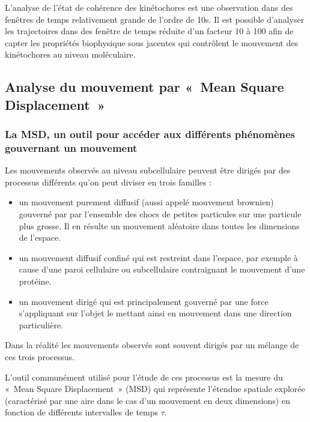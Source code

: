 \documentclass[12pt,a4paper,twoside,openright]{book}
\begin{document}
L'analyse de l'état de cohérence des kinétochores est une observation
dans des fenêtres de temps relativement grande de l'ordre de 10s. Il est
possible d'analyser les trajectoires dans des fenêtre de temps réduite
d'un facteur 10 à 100 afin de capter les propriétés biophysique sous
jacentes qui contrôlent le mouvement des kinétochores au niveau
moléculaire.

\subsection{Analyse du mouvement par «~Mean Square
Displacement~»}\label{analyse-du-mouvement-par-mean-square-displacement}

\subsubsection{La MSD, un outil pour accéder aux différents phénomènes
gouvernant un
mouvement}\label{la-msd-un-outil-pour-accuxe9der-aux-diffuxe9rents-phuxe9nomuxe8nes-gouvernant-un-mouvement}

Les mouvements observés au niveau subcellulaire peuvent être dirigés par
des processus différents qu'on peut diviser en trois familles :

\begin{itemize}
\item
  un mouvement purement diffusif (aussi appelé mouvement brownien)
  gouverné par par l'ensemble des chocs de petites particules sur une
  particule plus grosse. Il en résulte un mouvement aléatoire dans
  toutes les dimensions de l'espace.
\item
  un mouvement diffusif confiné qui est restreint dans l'espace, par
  exemple à cause d'une paroi cellulaire ou subcellulaire contraignant
  le mouvement d'une protéine.
\item
  un mouvement dirigé qui est principalement gouverné par une force
  s'appliquant sur l'objet le mettant ainsi en mouvement dans une
  direction particulière.
\end{itemize}

Dans la réalité les mouvements observés sont souvent dirigés par un
mélange de ces trois processus.

L'outil communément utilisé pour l'étude de ces processus est la mesure
du «~Mean Square Displacement~» (MSD) qui représente l'étendue spatiale
explorée (caractérisé par une aire dans le cas d'un mouvement en deux
dimensions) en fonction de différents intervalles de temps \(\tau\).
\end{document}
